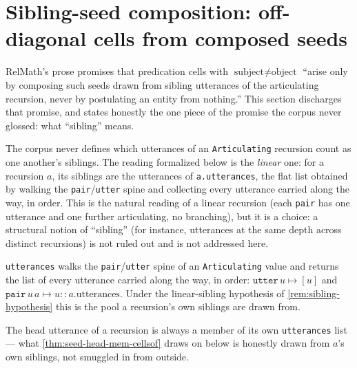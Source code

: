 \section{Sibling-seed composition: off-diagonal cells from composed seeds}

RelMath's prose promises that predication cells with \(\text{subject} \neq
\text{object}\) ``arise only by composing such seeds drawn from sibling
utterances of the articulating recursion, never by postulating an entity from
nothing.'' This section discharges that promise, and states honestly the one
piece of the promise the corpus never glossed: what ``sibling'' means.

\begin{remark}\label{rem:sibling-hypothesis}
The corpus never defines which utterances of an \texttt{Articulating}
recursion count as one another's siblings. The reading formalized below is
the \emph{linear} one: for a recursion \(a\), its siblings are the utterances
of \texttt{a.utterances}, the flat list obtained by walking the
\texttt{pair}/\texttt{utter} spine and collecting every utterance carried
along the way, in order. This is the natural reading of a linear recursion
(each \texttt{pair} has one utterance and one further articulating, no
branching), but it is a choice: a structural notion of ``sibling'' (for
instance, utterances at the same depth across distinct recursions) is not
ruled out and is not addressed here.
\end{remark}

\begin{definition}\label{thm:articulating-utterances}\leanok{}
\texttt{utterances} walks the \texttt{pair}/\texttt{utter} spine of an
\texttt{Articulating} value and returns the list of every utterance carried
along the way, in order: \(\texttt{utter}\,u \mapsto [u]\) and
\(\texttt{pair}\,u\,a \mapsto u :: a.\mathrm{utterances}\). Under the
linear-sibling hypothesis of \cref{rem:sibling-hypothesis} this is the pool a
recursion's own siblings are drawn from.
\end{definition}

\begin{proposition}\label{thm:head-mem-utterances}\leanok{}
The head utterance of a recursion is always a member of its own
\texttt{utterances} list --- what \cref{thm:seed-head-mem-cellsof} draws on
below is honestly drawn from \(a\)'s own siblings, not smuggled in from
outside.
\end{proposition}


